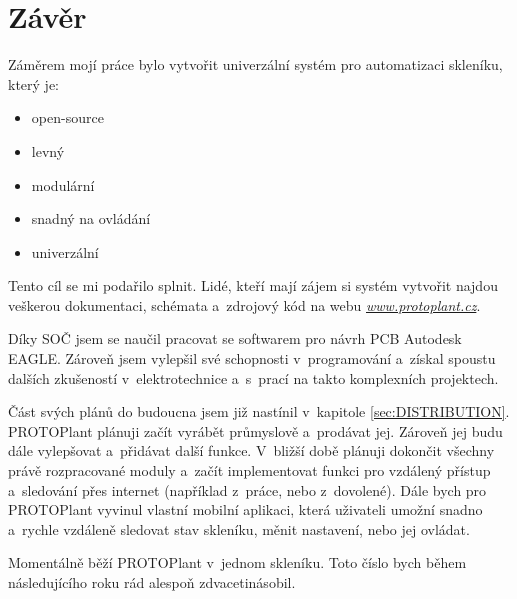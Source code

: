 \chapter*{Závěr}
Záměrem mojí práce bylo vytvořit univerzální systém pro automatizaci skle\-ní\-ku, který je:
\begin{itemize}
    \item open-source
    \item levný
    \item modulární
    \item snadný na ovládání
    \item univerzální
\end{itemize}

Tento cíl se mi podařilo splnit.
Lidé, kteří mají zájem si systém vytvořit najdou veškerou dokumentaci, schémata a~zdrojový kód na webu \textit{\url{www.protoplant.cz}}.

Díky SOČ jsem se naučil pracovat se softwarem pro návrh PCB Autodesk EAGLE.
Zároveň jsem vylepšil své schopnosti v~programování a~získal spoustu dalších zkušeností v~elektrotechnice a~s~prací na takto komplexních projektech.

Část svých plánů do budoucna jsem již nastínil v~kapitole \ref{sec:DISTRIBUTION}.
PROTOPlant plánuji začít vyrábět průmyslově a~prodávat jej.
Zároveň jej budu dále vylepšovat a~přidávat další funkce.
V~bližší době plánuji dokončit všechny právě rozpracované moduly a~začít implementovat funkci pro vzdálený přístup a~sledování přes internet (například z~práce, nebo z~dovolené).
Dále bych pro PROTOPlant vyvinul vlastní mobilní aplikaci, která uživateli umožní snadno a~rychle vzdáleně sledovat stav skleníku, měnit nastavení, nebo jej ovládat.

Momentálně běží PROTOPlant v~jednom skleníku. 
Toto číslo bych během následujícího roku rád alespoň zdvacetinásobil. 

\newpage
